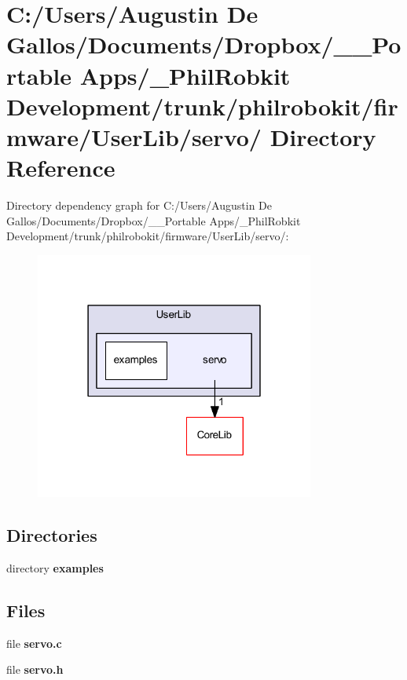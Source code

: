 \section{C\-:/\-Users/\-Augustin De Gallos/\-Documents/\-Dropbox/\-\_\-\-\_\-\-Portable Apps/\-\_\-\-Phil\-Robkit Development/trunk/philrobokit/firmware/\-User\-Lib/servo/ Directory Reference}
\label{dir_ccedd7fac5ddd5ebb6e2cf0a302bd4ad}
Directory dependency graph for C\-:/\-Users/\-Augustin De Gallos/\-Documents/\-Dropbox/\-\_\-\-\_\-\-Portable Apps/\-\_\-\-Phil\-Robkit Development/trunk/philrobokit/firmware/\-User\-Lib/servo/\-:\nopagebreak
\begin{figure}[H]
\begin{center}
\leavevmode
\includegraphics[width=260pt]{dir_ccedd7fac5ddd5ebb6e2cf0a302bd4ad_dep}
\end{center}
\end{figure}
\subsection*{Directories}
\begin{DoxyCompactItemize}
\item 
directory {\bf examples}
\end{DoxyCompactItemize}
\subsection*{Files}
\begin{DoxyCompactItemize}
\item 
file {\bf servo.\-c}
\item 
file {\bf servo.\-h}
\end{DoxyCompactItemize}
